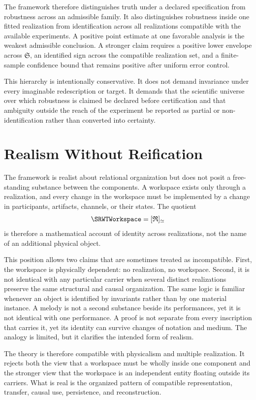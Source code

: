 The framework therefore distinguishes truth under a declared specification
from robustness across an admissible family. It also distinguishes robustness
inside one fitted realization from identification across all realizations
compatible with the available experiments. A positive point estimate at one
favorable analysis is the weakest admissible conclusion. A stronger claim
requires a positive lower envelope across \(\mathfrak S\), an identified sign
across the compatible realization set, and a finite-sample confidence bound
that remains positive after uniform error control.

This hierarchy is intentionally conservative. It does not demand invariance
under every imaginable redescription or target. It demands that the scientific
universe over which robustness is claimed be declared before certification and
that ambiguity outside the reach of the experiment be reported as partial or
non-identification rather than converted into certainty.

\section{Realism Without Reification}

The framework is realist about relational organization but does not posit a free-standing substance
between the components. A workspace exists only through a realization, and every change in the
workspace must be implemented by a change in participants, artifacts, channels, or their states. The
quotient
\[
\SRWTWorkspace=[\mathfrak R]_{\simeq}
\]
is therefore a mathematical account of identity across realizations, not the name of an additional
physical object.

This position allows two claims that are sometimes treated as incompatible. First, the workspace is
physically dependent: no realization, no workspace. Second, it is not identical with any particular
carrier when several distinct realizations preserve the same structural and causal organization. The same
logic is familiar whenever an object is identified by invariants rather than by one material instance. A
melody is not a second substance beside its performances, yet it is not identical with one performance.
A proof is not separate from every inscription that carries it, yet its identity can survive changes of
notation and medium. The analogy is limited, but it clarifies the intended form of realism.

The theory is therefore compatible with physicalism and multiple realization. It rejects both the view
that a workspace must be wholly inside one component and the stronger view that the workspace is an
independent entity floating outside its carriers. What is real is the organized pattern of compatible
representation, transfer, causal use, persistence, and reconstruction.

